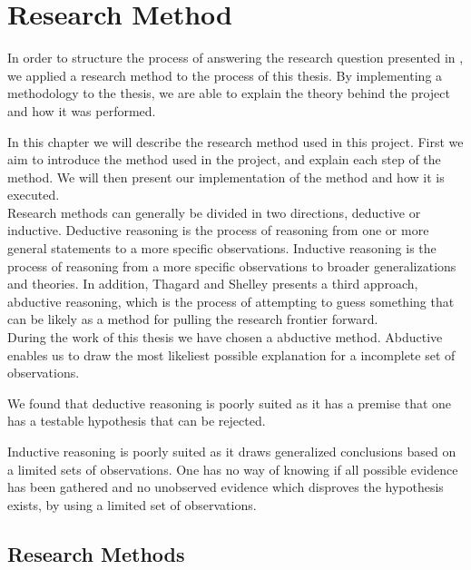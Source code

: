 
\chapter{Research Method} %
\label{cha:research_questions_and_method}
In order to structure the process of answering the research question presented
in , we applied a research method to the 
process of this thesis. By implementing a methodology to the thesis, we are
able to explain the theory behind the project and how it was performed.

In this chapter we will describe the research method used in this project.
First we aim to introduce the method used in the project, and explain each step
of the method. We will then present our implementation of the method and how it
is executed.\\

Research methods can generally be divided in two directions, deductive or
inductive. Deductive reasoning is the process of reasoning from one or more
general statements to a more specific observations. Inductive reasoning is the
process of reasoning from a more specific observations to broader
generalizations and theories. \cite{ deductionAndInductionTrochim}
In addition, Thagard and Shelley \cite{thagard1997abductive} presents a
third approach, abductive \cite{ wiki:abductiveReasoning} reasoning, 
which is the process of attempting to guess something that can be likely as a method for pulling the research frontier forward.\\

During the work of this thesis we have chosen a abductive method. Abductive
enables us to draw the most likeliest possible explanation for a incomplete set
of observations.

We found that deductive reasoning is poorly suited as it has a premise that 
one has a testable hypothesis that can be rejected. %

Inductive reasoning is poorly suited as it draws generalized conclusions based
on a limited sets of observations. One has no way of knowing if all possible
evidence has been gathered and no unobserved evidence which disproves the
hypothesis exists, by using a limited set of observations\cite{ deductionAndInductionButte}.

\section{Research Methods} %
\label{sec:research_method}

